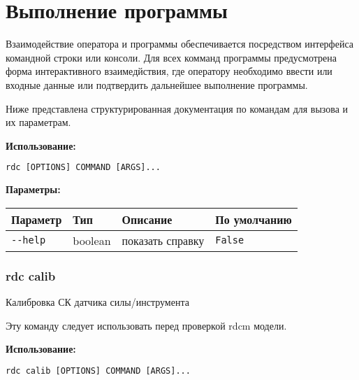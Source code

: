 \newpage
\section{Выполнение программы}

Взаимодействие оператора и программы обеспечивается посредством интерфейса командной строки или консоли.
Для всех комманд программы предусмотрена форма интерактивного взаимедйствия, где оператору необходимо ввести или входные данные или подтвердить дальнейшее выполнение программы.

Ниже представлена структурированная документация по командам для вызова и их параметрам.

\textbf{Использование:}
\begin{lstlisting}[language=python, numbers=none, frame=single]
    rdc [OPTIONS] COMMAND [ARGS]...
\end{lstlisting}

\textbf{Параметры:}
\begin{center}
\fontsize{10pt}{10pt}\selectfont
\begin{longtable}[]{p{5cm}|p{2cm}|p{3.5cm}|p{5cm}}
    \hline
\toprule()
Параметр & Тип & Описание & По умолчанию \\
\hline
\midrule()
\endhead
\texttt{-\/-help} & boolean & показать справку &
\texttt{False} \\
\bottomrule()
\hline
\end{longtable}
\end{center}

\hypertarget{rdc-calib}{%
\subsubsection{rdc calib}\label{rdc-calib}}

Калибровка СК датчика силы/инструмента

Эту команду следует использовать перед проверкой rdcm модели.

\textbf{Использование:}
\begin{lstlisting}[language=python, numbers=none, frame=single]
rdc calib [OPTIONS] COMMAND [ARGS]...
\end{lstlisting}


